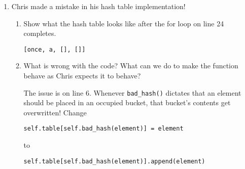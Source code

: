 \documentclass[11pt]{article}
\newenvironment{answer}{\large\lstset{basicstyle=\tiny\ttfamily}\color{white}}{}
\newenvironment{answer}{\large\lstset{basicstyle=\large\ttfamily}\color{red}}{}
\begin{document}
\begin{enumerate}
\begin{enumerate}
	\begin{answer}
	 \begin{lstlisting}
	def enqueue(lst, val):
		lst.append(val)
	def dequeue(lst):
		list.pop(0)
	\end{lstlisting}
	\end{answer}

\item Which of the data structures you implemented is more efficient and why? Give a better way to implement the slower structure, and discuss how this would change the time complexity of its operations. \\
\begin{answer}
Because the queue must be able to modify both ends of the list, it pays an O(n) cost to remove the beginning element during each dequeue operation. This could be reduced to O(1) by using a linked list instead of a Python list.
\end{answer}
\end{enumerate}

\pagebreak
\section*{Hashing and Hash Tables}

\item Chris made a mistake in his hash table implementation!

    
    \begin{enumerate}
    \item Show what the hash table looks like after the for loop on line 24
          completes. 

        \begin{answer}
		\begin{lstlisting}[numbers=none]
[once, a, [], []]
		\end{lstlisting}

        \end{answer}

    \item What is wrong with the code? What can we do to make the function behave as Chris expects it to behave?

        \begin{answer}
        The issue is on line 6. Whenever \texttt{bad\_hash()} dictates that an element should be placed in an occupied bucket, that bucket's contents get overwritten! Change 
\begin{lstlisting}[numbers=none]
self.table[self.bad_hash(element)] = element 
\end{lstlisting} to 
\begin{lstlisting}[numbers=none]
self.table[self.bad_hash(element)].append(element)
\end{lstlisting}


\end{answer}
\end{enumerate}
\end{enumerate}
\end{document}
